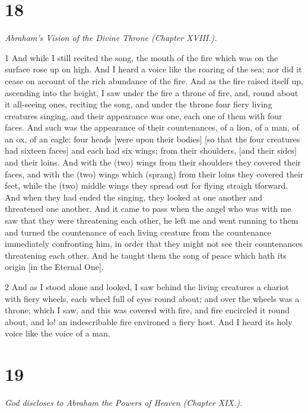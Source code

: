 \chapter{18}

\par \textit{Abraham's Vision of the Divine Throne (Chapter XVIII.).}

\par 1 And while I still recited the song, the mouth of the fire which was on the surface rose up on high. And I heard a voice like the roaring of the sea; nor did it cease on account of the rich abundance of the fire. And as the fire raised itself up, ascending into the height, I saw under the fire a throne of fire, and, round about it all-seeing ones, reciting the song, and under the throne four fiery living creatures singing, and their appearance was one, each one of them with four faces. And such was the appearance of their countenances, of a lion, of a man, of an ox, of an eagle: four heads [were upon their bodies] [so that the four creatures had sixteen faces] and each had six wings; from their shoulders, [and their sides] and their loins. And with the (two) wings from their shoulders they covered their faces, and with the (two) wings which (sprang) from their loins they covered their feet, while the (two) middle wings they spread out for flying straigh tforward. And when they had ended the singing, they looked at one another and threatened one another. And it came to pass when the angel who was with me saw that they were threatening each other, he left me and went running to them and turned the countenance of each living creature from the countenance immediately confronting him, in order that they might not see their countenances threatening each other. And he taught them the song of peace which hath its origin [in the Eternal One]. 

\par 2 And as I stood alone and looked, I saw behind the living creatures a chariot with fiery wheels, each wheel full of eyes round about; and over the wheels was a throne; which I saw, and this was covered with fire, and fire encircled it round about, and lo! an indescribable fire environed a fiery host. And I heard its holy voice like the voice of a man.

\chapter{19}

\par \textit{God discloses to Abraham the Powers of Heaven (Chapter XIX.).}

